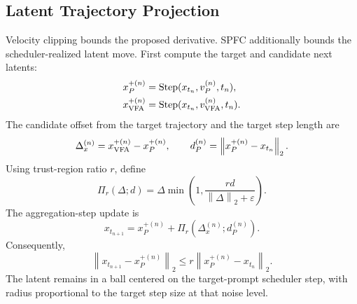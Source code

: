 \documentclass[letterpaper]{article} %
\newcommand{\clip}{\operatorname{clip}}
\newcommand{\Step}{\operatorname{Step}}
\newcommand{\norm}[1]{\left\lVert #1 \right\rVert_2}
\newcommand{\eps}{\varepsilon}
\begin{document}
\subsection{Latent Trajectory Projection}

Velocity clipping bounds the proposed derivative. SPFC additionally
bounds the scheduler-realized latent move. First compute the target and
candidate next latents:
\begin{align}
x_{P}^{+(n)}
&=\Step(x_{t_n},v_P^{(n)},t_n),\\
x_{\rm VFA}^{+(n)}
&=\Step(x_{t_n},v_{\rm VFA}^{(n)},t_n).
\end{align}
The candidate offset from the target trajectory and the target step
length are
\begin{equation}
\Delta_x^{(n)}=x_{\rm VFA}^{+(n)}-x_P^{+(n)},
\qquad
d_P^{(n)}=\norm{x_P^{+(n)}-x_{t_n}}.
\end{equation}
Using trust-region ratio $r$, define
\begin{equation}
\Pi_r(\Delta;d)
=
\Delta\min\!\left(1,\frac{rd}{\norm{\Delta}+\eps}\right).
\end{equation}
The aggregation-step update is
\begin{equation}
x_{t_{n+1}}
=
x_P^{+(n)}+\Pi_r(\Delta_x^{(n)};d_P^{(n)}).
\end{equation}
Consequently,
\begin{equation}
\norm{x_{t_{n+1}}-x_P^{+(n)}}
\leq
r\norm{x_P^{+(n)}-x_{t_n}}.
\end{equation}
The latent remains in a ball centered on the target-prompt scheduler
step, with radius proportional to the target step size at that noise
level.


\end{document}
